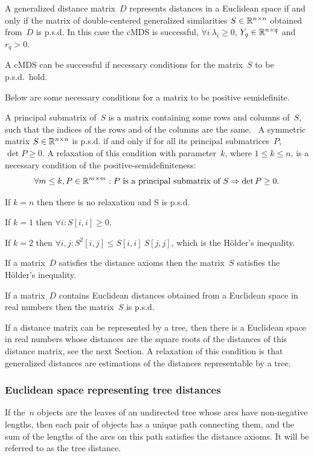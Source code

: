 \documentclass[10pt,a4paper]{article}
\begin{document}
A generalized distance matrix~$D$ represents distances in a Euclidean space
if and only if the matrix of double-centered generalized similarities $S \in \mathbb R^{n \times n}$ obtained from~$D$ is p.s.d.
In this case the cMDS is successful, $\forall i \ \lambda_i \ge 0$, $Y_q \in \mathbb R^{n \times q}$ and $r_q > 0$.

A cMDS can be successful if necessary conditions for the matrix~$S$ to be p.s.d.~hold.

Below are some necessary conditions for a matrix to be positive semidefinite.

A principal submatrix of~$S$ is a matrix containing some rows and columns of~$S$, such that the indices of the rows and of the columns are the same. \
A symmetric matrix $S \in \mathbb R^{n \times n}$ is p.s.d. if and only if for all its principal submatrices~$P$, $\det P \ge 0$.
A relaxation of this condition with parameter~$k$, where $1 \le k \le n$, is a necessary condition of the positive-semidefiniteness:
$$ \forall m \le k, P \in \mathbb R^{m \times m} : P \text { is a principal submatrix of } S \Rightarrow \det P \ge 0. $$

If $k = n$ then there is no relaxation and S is p.s.d.

If $k = 1$ then $\forall i : S[i,i] \ge 0$.

If $k = 2$ then $\forall i, j : S^2[i,j] \le S[i,i] \ S[j,j]$, which is the H\"older's inequality.

If a matrix~$D$ satisfies the distance axioms then the matrix~$S$ satisfies the H\"older's inequality.

If a matrix~$D$ contains Euclidean distances obtained from a Euclidean space in real numbers then the matrix~$S$ is p.s.d.

If a distance matrix can be represented by a tree, then there is a Euclidean space in real numbers
whose distances are the square roots of the distances of this distance matrix, see the next Section.
A relaxation of this condition is that generalized distances are estimations of the distances representable by a tree.


\subsubsection {Euclidean space representing tree distances}

If the~$n$ objects are the leaves of an undirected tree whose arcs have non-negative lengths,
then each pair of objects has a unique path connecting them, and the sum of the lengths of the arcs on this path satisfies the distance axioms.
It will be referred to as the tree distance.
\end{document}
